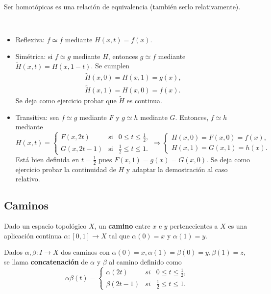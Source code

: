 \documentclass[bibtex, anon]{TEMat-article}
\begin{document}
\begin{lema} Ser homotópicas es una relación de equivalencia (también serlo relativamente).
\end{lema}
\begin{demostracion}\
	\begin{itemize}
		\item Reflexiva: $f\simeq f$ mediante $H(x,t)=f(x)$.
		\item Simétrica: si $f\simeq g$ mediante $H$, entonces $g\simeq f$ mediante $\widetilde{H}(x,t)=H(x,1-t)$. Se cumplen
		\begin{gather*}
		\widetilde{H}(x,0)=H(x,1)=g(x),\\
		\widetilde{H}(x,1)=H(x,0)=f(x).
		\end{gather*}
		Se deja como ejercicio probar que $\widetilde{H}$ es continua.
		\item Transitiva: sea $f\simeq g$ mediante $F$ y $g\simeq h$ mediante $G$. Entonces, $f\simeq h$ mediante
		\begin{equation*}
		H(x,t)=\left\{\begin{array}{ccc}
		F(x,2t) & \text{si} & 0\leq t\leq\frac{1}{2},\\
		G(x,2t-1) & \text{si} & \frac{1}{2}\leq t\leq 1.
		\end{array}\right.\Longrightarrow\left\{\begin{array}{c}
		H(x,0)=F(x,0)=f(x),\\
		H(x,1)=G(x,1)=h(x).
		\end{array}\right.
		\end{equation*}
		Está bien definida en $t=\frac{1}{2}$ pues $F(x,1)=g(x)=G(x,0)$. Se deja como ejercicio probar la continuidad de $H$ y adaptar la demostración al caso relativo.
	\end{itemize}
\end{demostracion}

\subsection{Caminos}

\begin{definicion}
Dado un espacio topológico $X$, un \textbf{camino} entre $x$ e $y$ pertenecientes a $X$ es una aplicación continua $\alpha:[0,1]\to X$ tal que $\alpha(0)=x$ y $\alpha(1)=y$. %
\end{definicion}

\begin{definicion} Dados $\alpha,\beta:I\to X$ dos caminos con $\alpha(0)=x,\alpha(1)=\beta(0)=y,\beta(1)=z$, se llama \textbf{concatenación} de $\alpha$ y $\beta$ al camino definido como
	\begin{equation*}
	\alpha\beta(t)=\left\{\begin{array}{lcc}
	\alpha(2t) & si & 0\leq t\leq\frac{1}{2},\\
	\beta(2t-1) & si & \frac{1}{2}\leq t\leq 1.
	
	\end{array}\right.
	\end{equation*}
\end{definicion}
\end{document}
